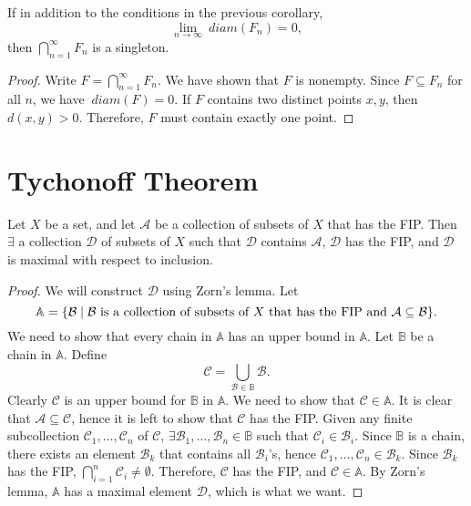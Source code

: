 \begin{prop}
    \label{prop:nested-closed-sets}
    If in addition to the conditions in the previous corollary, 
    \[
    \lim_{n\to\infty} ~diam (F_n) = 0,
    \]
    then $\bigcap_{n=1}^\infty F_n$ is a singleton.
    \begin{proof}
        Write $F = \bigcap_{n=1}^\infty F_n$. We have shown that $F$ is nonempty. Since $F \subseteq F_n$ for all $n$, we have $~diam (F) = 0$. If $F$ contains two distinct points $x, y$, then $d(x, y) > 0$. Therefore, $F$ must contain exactly one point. 
    \end{proof}
\end{prop}

\section{Tychonoff Theorem}

\begin{lm}
    \label{lm:tychonoff-lm1}
    Let $X$ be a set, and let $\mathcal A$ be a collection of subsets of $X$ that has the FIP. Then $\exists$ a collection $\mathcal D$ of subsets of $X$ such that $\mathcal D$ contains $\mathcal A$, $\mathcal D$ has the FIP, and $\mathcal D$ is maximal with respect to inclusion.
    \begin{proof}
        We will construct $\mathcal D$ using Zorn's lemma. Let
        \[
        \mathbb A = {\left\{{\mathcal B \mid \mathcal B \text{ is a collection of subsets of $X$ that has the FIP and } \mathcal A \subseteq \mathcal B}\right\}}.
        \]
        We need to show that every chain in $\mathbb A$ has an upper bound in $\mathbb A$. Let $\mathbb B$ be a chain in $\mathbb A$. Define
        \[
        \mathcal C = \bigcup_{\mathcal B \in \mathbb B} \mathcal B.
        \]
        Clearly $\mathcal C$ is an upper bound for $\mathbb B$ in $\mathbb A$. We need to show that $\mathcal C \in \mathbb A$. It is clear that $\mathcal A \subseteq \mathcal C$, hence it is left to show that $\mathcal C$ has the FIP. Given any finite subcollection $\mathcal C_1, \ldots, \mathcal C_n$ of $\mathcal C$, $\exists \mathcal B_1, \ldots, \mathcal B_n \in \mathbb B$ such that $\mathcal C_i \in \mathcal B_i$. Since $\mathbb B$ is a chain, there exists an element $\mathcal B_k$ that contains all $\mathcal B_i$'s, hence $\mathcal C_1, \ldots, \mathcal C_n \in \mathcal B_k$. Since $\mathcal B_k$ has the FIP, $\bigcap_{i=1}^n \mathcal C_i \neq \emptyset$. Therefore, $\mathcal C$ has the FIP, and $\mathcal C \in \mathbb A$. By Zorn's lemma, $\mathbb A$ has a maximal element $\mathcal D$, which is what we want.
    \end{proof}
\end{lm}

